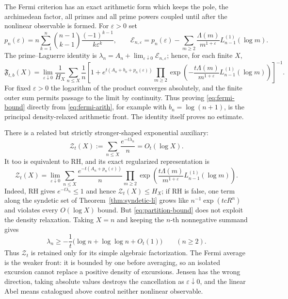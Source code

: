 \documentclass[11pt]{amsart}
\theoremstyle{definition}
\theoremstyle{remark}
\theoremstyle{definition}
\begin{document}
The Fermi criterion has an exact arithmetic form which keeps the pole, the archimedean factor,
all primes and all prime powers coupled until after the nonlinear observable is formed.  For
$\varepsilon>0$ set
\[
 p_n(\varepsilon)=n\sum_{k=1}^{n}\binom{n-1}{k-1}
       \frac{(-1)^{k-1}}{k\varepsilon^k},
\qquad
 \mathcal E_{n,\varepsilon}=p_n(\varepsilon)
 -\sum_{m\ge2}\frac{\Lambda(m)}{m^{1+\varepsilon}}
       L_{n-1}^{(1)}(\log m).
\]
The prime--Laguerre identity is
$\lambda_n=A_n+\lim_{\varepsilon\downarrow0}\mathcal E_{n,\varepsilon}$; hence, for each finite
$X$,
\begin{equation}\label{eq:fermi-arith}
\boxed{
 \mathfrak F_{t,b}(X)=\lim_{\varepsilon\downarrow0}\frac1{H_X}
 \sum_{n\le X}\frac1n
 \left[1+e^{t(A_n+b_n+p_n(\varepsilon))}
 \prod_{m\ge2}\exp\!\left(
 -\frac{t\Lambda(m)}{m^{1+\varepsilon}}L_{n-1}^{(1)}(\log m)
 \right)\right]^{-1}. }
\end{equation}
For fixed $\varepsilon>0$ the logarithm of the product converges absolutely, and the finite outer
sum permits passage to the limit by continuity.  Thus proving \eqref{eq:fermi-bound} directly
from \eqref{eq:fermi-arith}, for example with $b_n=\log(n+1)$, is the principal density-relaxed
arithmetic front.  The identity itself proves no estimate.

There is a related but strictly stronger-shaped exponential auxiliary:
\begin{equation}\label{eq:partition-bound}
 \mathcal Z_t(X):=\sum_{n\le X}\frac{e^{-t\lambda_n}}n=O_t(\log X).
\end{equation}
It too is equivalent to RH, and its exact regularized representation is
\begin{equation}\label{eq:partition-arith}
 \mathcal Z_t(X)=\lim_{\varepsilon\downarrow0}
 \sum_{n\le X}\frac{e^{-t(A_n+p_n(\varepsilon))}}{n}
 \prod_{m\ge2}
 \exp\!\left(\frac{t\Lambda(m)}{m^{1+\varepsilon}}
                 L_{n-1}^{(1)}(\log m)\right).
\end{equation}
Indeed, RH gives $e^{-t\lambda_n}\le1$ and hence $\mathcal Z_t(X)\le H_X$; if RH is false,
one term along the syndetic set of Theorem~\ref{thm:syndetic-li} grows like
$n^{-1}\exp(tcR^n)$ and violates every $O(\log X)$ bound.
But \eqref{eq:partition-bound} does not exploit the density relaxation.  Taking $X=n$ and keeping
the $n$-th nonnegative summand gives
\begin{equation}\label{eq:partition-pointwise}
 \lambda_n\ge-\frac1t\bigl(\log n+\log\log n+O_t(1)\bigr)
 \qquad(n\ge2).
\end{equation}
Thus $\mathcal Z_t$ is retained only for its simple algebraic factorization.  The Fermi average is
the weaker front: it is bounded by one before averaging, so an isolated excursion cannot replace
a positive density of excursions.  Jensen has the wrong direction, taking absolute values
destroys the cancellation as $\varepsilon\downarrow0$, and the linear Abel means catalogued above
control neither nonlinear observable.
\end{document}
